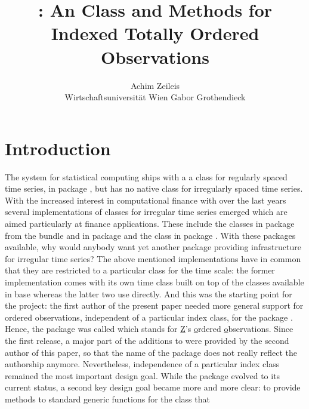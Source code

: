 \documentclass{Z}
\author{Achim Zeileis\\Wirtschaftsuniversit\"at Wien \And
        Gabor Grothendieck}
\title{\pkg{zoo}: An \proglang{S3} Class and Methods for
  Indexed Totally Ordered Observations}
\begin{document}



\section{Introduction} \label{sec:intro}

The  system for statistical computing
\citep[\url{http://www.R-project.org/}]{zoo:R:2005}
ships with a a class for regularly spaced time series,
 in package , but has no native class for
irregularly spaced time series. With the increased interest in
computational finance with  over the last years
several implementations of classes for irregular time series 
emerged which are aimed particularly at finance applications.
These include the  classes 
in package  from the  bundle \citep{zoo:fCalendar:2004}
and  in package  \citep{zoo:tseries:2005}
and the  class  in package  \citep{zoo:its:2004}.
With these packages available, why would anybody want yet another 
package providing infrastructure for irregular time series?
The above mentioned implementations have in common that they are restricted to a particular
class for the time scale: the former implementation comes with its own time class
 built on top of the  classes
available in base  whereas the latter two use  directly.
And this was the starting point for the  project: the first author
of the present paper needed
more general support for ordered observations, independent of a particular
index class, for the package 
\citep{zoo:Zeileis+Leisch+Hornik:2002}. Hence, the package was called
 which stands for \underline{Z}'s \underline{o}rdered \underline{o}bservations.
Since the first release, a major part of the additions to 
were provided by the second author of this paper, so that the name
of the package does not really reflect the authorship anymore.
Nevertheless, independence of a particular index class remained
the most important design goal. While the package evolved to its current
status, a second key design goal became more and more clear: to provide
methods to standard generic functions for the  class that 
\end{document}
